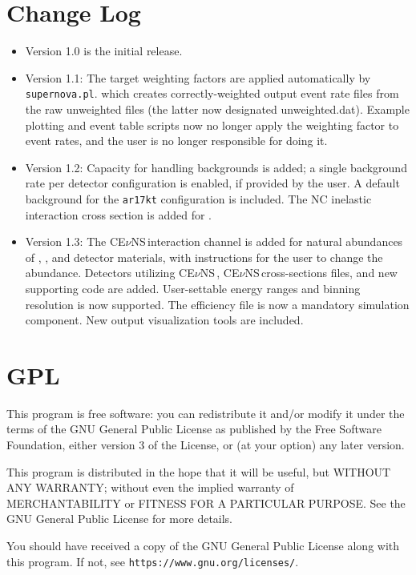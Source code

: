 \documentclass{article}
\newcommand{\cev}{CE$\nu$NS\,}
\begin{document}
\begin{appendices}
\section{Change Log}
\begin{itemize}
    \item Version 1.0 is the initial release.
    \item Version 1.1: The target weighting factors are applied automatically by \texttt{supernova.pl}. which creates correctly-weighted output event rate files from the raw unweighted files (the latter now designated unweighted.dat). Example plotting and event table scripts now no longer apply the weighting factor to event rates, and the user is no longer responsible for doing it.
    \item Version 1.2: Capacity for handling backgrounds is added; a single background rate per detector configuration is enabled, if provided by the user. A default background for the \texttt{ar17kt} configuration is included. The NC inelastic interaction cross section is added for .
    \item Version 1.3: The \cev interaction channel is added for natural abundances of , , and  detector materials, with instructions for the user to change the abundance. Detectors utilizing \cev, \cev cross-sections files, and new supporting code are added. User-settable energy ranges and binning resolution is now supported. The efficiency file is now a mandatory simulation component. New output visualization tools are included.
\end{itemize}

\section{GPL}
This program is free software: you can redistribute it and/or modify it under the terms of the GNU General Public License as published by the Free Software Foundation, either version 3 of the License, or (at your option) any later version.

This program is distributed in the hope that it will be useful, but WITHOUT ANY WARRANTY; without even the implied warranty of MERCHANTABILITY or FITNESS FOR A PARTICULAR PURPOSE.  See the GNU General Public License for more details.

You should have received a copy of the GNU General Public License along with this program.  If not, see \texttt{https://www.gnu.org/licenses/}.
\end{appendices}



 
\end{document}
